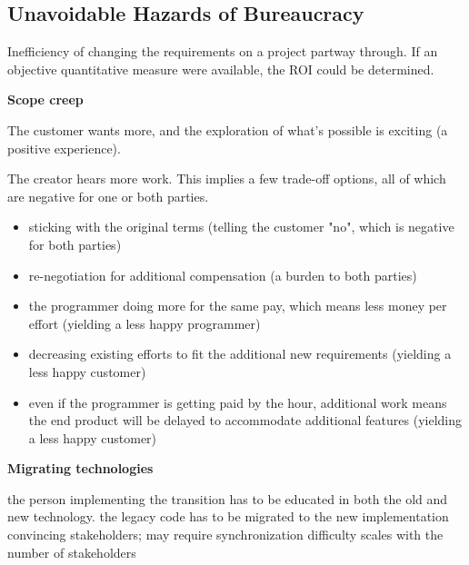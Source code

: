 \subsection{Unavoidable Hazards of Bureaucracy\label{sec:unavoidable_hazards}}

Inefficiency of changing the requirements on a project partway through. If an objective quantitative measure were available, the ROI could be determined. 


\textbf{Scope creep}

The customer wants more, and the exploration of what's possible is exciting (a positive experience).

The creator hears more work. This implies a few trade-off options, all of which are negative for one or both parties.
\begin{itemize}
    \item sticking with the original terms (telling the customer "no", which is negative for both parties)
    \item re-negotiation for additional compensation (a burden to both parties)
    \item the programmer doing more for the same pay, which means less money per effort (yielding a less happy programmer)
    \item decreasing existing efforts to fit the additional new requirements (yielding a less happy customer)
    \item even if the programmer is getting paid by the hour, additional work means the end product will be delayed to accommodate additional features (yielding a less happy customer)
\end{itemize}


\textbf{Migrating technologies}

the person implementing the transition has to be educated in both the old and new technology. 
the legacy code has to be migrated to the new implementation
convincing stakeholders; may require synchronization
difficulty scales with the number of stakeholders 